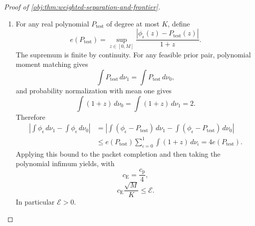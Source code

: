 \documentclass[11pt]{article}
\begin{document}
\begin{proof}[Proof of \cref{obj:thm:weighted-separation-and-frontier}]
\begin{enumerate}
The annihilation and normalization established above give
\[
\int z^\ell\,d\sigma_+
=\int z^\ell\,d\sigma_-,
\qquad \ell=0,\ldots,K,
\]
\[
\int(1+z)\,d(\sigma_++\sigma_-)=1.
\]
Writing, as in \cref{obj:def:weighted-handle},
\[
t=\sigma_+(\mathbb R),
\qquad
u=\int z\,d\sigma_+,
\qquad
z_0=\frac{1-u}{1-t},
\]
the degree-zero and degree-one identities imply
\[
\sigma_-(\mathbb R)=t,
\qquad
\int z\,d\sigma_-=u,
\qquad
t+u=\frac12.
\]
Since \(t,u\ge0\),
\[
0\le t\le\frac12,
\qquad
z_0=\frac{1/2+t}{1-t},
\qquad
\frac12\le z_0\le2\le M.
\]
In particular \(t<1\), so the completion map is defined, and its positive-part coefficient equals \(1-t\). Set
\[
\nu_0=\sigma_-+(1-t)\delta_{z_0},
\qquad
\nu_1=\sigma_++(1-t)\delta_{z_0}.
\]
Their masses and first moments satisfy
\[
\nu_0(\mathbb R)=\nu_1(\mathbb R)=t+(1-t)=1,
\qquad
\int z\,d\nu_0=\int z\,d\nu_1=u+(1-t)z_0=1.
\]
The common atom cancels in every moment difference, so
\[
(\nu_0,\nu_1)\in\mathfrak N_{K,M},
\qquad
\mathscr H^w(\sigma_+,\sigma_-)=(\nu_0,\nu_1).
\]
It also cancels in the target difference:
\[
\begin{aligned}
\int\phi_\epsilon\,d\nu_1-\int\phi_\epsilon\,d\nu_0
&=
\int_{-\pi}^{\pi}
\phi_\epsilon\{z_M(\omega)\}
\frac{H_{K,M}(\omega)}{W_{K,M}}\,
\frac{d\omega}{2\pi}.
\end{aligned}
\]
Hence the explicit completion has gap at least
\(c_{\mathrm p}\sqrt M/K\).

\item
For any real polynomial \(P_{\mathrm{test}}\) of degree at most \(K\), define
\[
e(P_{\mathrm{test}})
=\sup_{z\in[0,M]}
\frac{|\phi_\epsilon(z)-P_{\mathrm{test}}(z)|}{1+z}.
\]
The supremum is finite by continuity. For any feasible prior pair, polynomial moment matching gives
\[
\int P_{\mathrm{test}}\,d\nu_1
=\int P_{\mathrm{test}}\,d\nu_0,
\]
and probability normalization with mean one gives
\[
\int(1+z)\,d\nu_0=\int(1+z)\,d\nu_1=2.
\]
Therefore
\[
\begin{aligned}
\left|\int\phi_\epsilon\,d\nu_1-\int\phi_\epsilon\,d\nu_0\right|
&=
\left|
\int(\phi_\epsilon-P_{\mathrm{test}})\,d\nu_1
-\int(\phi_\epsilon-P_{\mathrm{test}})\,d\nu_0
\right|\\
&\le
e(P_{\mathrm{test}})
\sum_{\iota=0}^1\int(1+z)\,d\nu_\iota
=4e(P_{\mathrm{test}}).
\end{aligned}
\]
Applying this bound to the packet completion and then taking the polynomial infimum yields, with
\[
c_{\mathrm E}=\frac{c_{\mathrm p}}4,
\]
\[
c_{\mathrm E}\frac{\sqrt M}{K}\le\mathcal E.
\]
In particular \(\mathcal E>0\).


\end{enumerate}
\end{proof}
\end{document}
